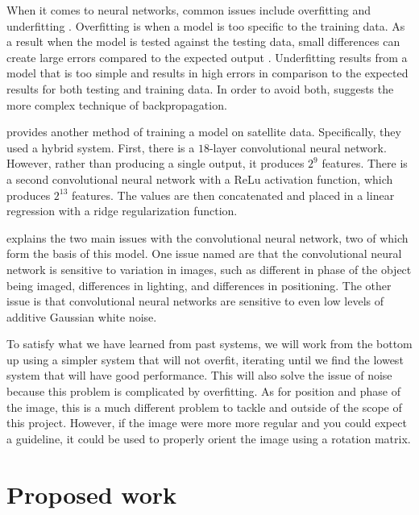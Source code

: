 \documentclass[11pt]{report}
\begin{document}
When it comes to neural networks,
common issues include overfitting and underfitting%
\cite{Vignesh2020a}\cite{Lawrence2005a}.
Overfitting is when a model is too specific to the training data.
As a result when the model is tested against the testing data,
small differences can create large errors compared to the expected output%
\cite{Gao2022a}.
Underfitting results from a model that is too simple
and results in high errors in comparison to the expected results
for both testing and training data\cite{Vignesh2020a}.
In order to avoid both, \textcite{Lawrence2005a} suggests the more complex technique of backpropagation.

\textcite{Rolf2021a} provides another method of training a model on satellite data.
Specifically, they used a hybrid system.
First, there is a \(18\)-layer convolutional neural network\cite{MATLAB2018resnet_a}.
However, rather than producing a single output,
it produces \(2^{9}\) features.
There is a second convolutional neural network with a ReLu activation function, which produces \(2^{13}\) features\cite{Rolf2021a}.
The values are then concatenated and placed in a linear regression with a ridge regularization function\cite{Rolf2021a}.

\textcite{Sharma2020a} explains the two main issues with the convolutional neural network, two of which form the basis of this model.
One issue named are that the convolutional neural network is sensitive to variation in images,
such as different in phase of the object being imaged,
differences in lighting,
and differences in positioning.
The other issue is that convolutional neural networks are sensitive to even low levels of additive Gaussian white noise.

To satisfy what we have learned from past systems,
we will work from the bottom up using a simpler system that will not overfit,
iterating until we find the lowest system that will have good performance.
This will also solve the issue of noise because this problem is complicated by overfitting.
As for position and phase of the image, this is a much different problem to tackle and outside of the scope of this project.
However, if the image were more more regular and you could expect a guideline,
it could be used to properly orient the image using a rotation matrix.

\section{Proposed work}
\end{document}
